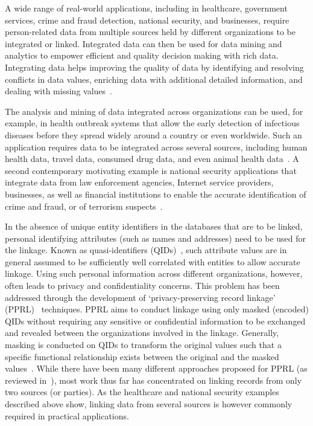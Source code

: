 \documentclass{sig-alternate}
\begin{document}
A wide range of real-world applications, including in healthcare,
government services, crime and fraud detection, 
national security, and businesses, require person-related data from multiple sources held by different organizations to be integrated or linked. Integrated data can then be used for data mining and analytics to empower efficient and quality decision making with rich data.  
Integrating data helps improving the quality of data by 
identifying and resolving conflicts in
data values, enriching data with additional detailed information, and
dealing with missing
values~\cite{Chr12}. 

The analysis and mining of data integrated across organizations can be used, for example,
in health outbreak systems that allow the early detection of infectious diseases before they
spread widely around a country or even worldwide. %
Such an application requires data to be integrated across several sources, 
including
human health data, travel data, consumed drug data, 
and even animal health data~\cite{Clif04}.
A second contemporary motivating example is
national security applications that integrate data
from law enforcement agencies, Internet service
providers, businesses, as well as financial 
institutions 
to enable the accurate
identification of crime and fraud, or of terrorism suspects~\cite{Phu12}.

In the absence of unique entity identifiers in the databases
that are to be linked, 
personal identifying attributes (such as names and 
addresses) need to be used for the
linkage. Known as quasi-identifiers (QIDs)~\cite{Vat14}, 
such attribute values are in general assumed to be
sufficiently well correlated with
entities to allow accurate linkage. Using such personal information
across different organizations,
however, often leads to privacy and confidentiality concerns. 
This problem has been addressed through the development of
`privacy-preserving record
linkage' (PPRL)~\cite{Vat13} techniques. PPRL aims to
conduct linkage using only masked (encoded) QIDs
without requiring any sensitive or confidential information
to be exchanged and revealed between the organizations
involved in the linkage.
Generally,
masking is conducted on QIDs 
to transform the original values such that a specific
functional relationship exists between the original and the masked
values~\cite{Vat14}.
While there have been many different approaches proposed for
PPRL (as reviewed in~\cite{Vat13}), most work  
thus far has concentrated on
linking records from only two sources (or parties). 
As the healthcare and national security examples
described above show, linking data from several
sources is however commonly required in practical applications.
\end{document}
